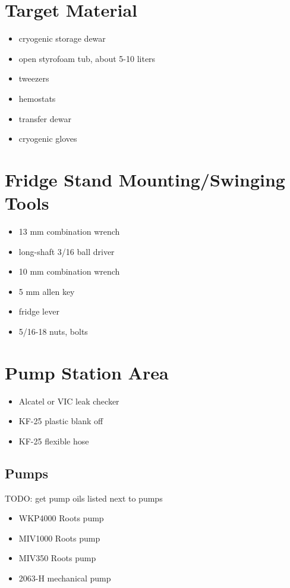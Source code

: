 \section{Target Material}
\begin{itemize}
 \item cryogenic storage \lnn{} dewar
\item open styrofoam tub, about 5-10 liters
\item tweezers
\item hemostats
\item \lnn{} transfer dewar
\item cryogenic gloves
\end{itemize}

\section{Fridge Stand Mounting/Swinging Tools}

\begin{itemize}
  \item 13 mm combination wrench
  \item long-shaft 3/16\inches{} ball driver
  \item 10 mm combination wrench
  \item 5 mm allen key
  \item fridge lever
  \item {} 5/16\inches{}-18 nuts, bolts
\end{itemize}


\section{Pump Station Area}
  \begin{itemize}
   \item Alcatel or VIC leak checker
   \item KF-25 plastic blank off
   \item KF-25 flexible hose
  \end{itemize}

  \subsection{\het{} Pumps} %
TODO: get pump oils listed next to pumps
\begin{itemize}
 \item {} WKP4000 Roots pump 
 \item {} MIV1000 Roots pump
 \item {} MIV350 Roots pump
 \item {} 2063-H mechanical pump
\end{itemize}

